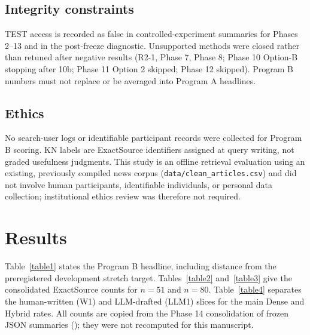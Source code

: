 \documentclass[10pt,letterpaper]{article}
\begin{document}
\subsection*{Integrity constraints}

TEST access is recorded as false in controlled-experiment summaries for Phases 2--13 and in the post-freeze diagnostic. Unsupported methods were closed rather than retuned after negative results (R2-1, Phase 7, Phase 8; Phase 10 Option-B stopping after 10b; Phase 11 Option 2 skipped; Phase 12 skipped). Program B numbers must not replace or be averaged into Program A headlines.

\subsection*{Ethics}

No search-user logs or identifiable participant records were collected for Program B scoring. KN labels are ExactSource identifiers assigned at query writing, not graded usefulness judgments. This study is an offline retrieval evaluation using an existing, previously compiled news corpus (\texttt{data/clean\_articles.csv}) and did not involve human participants, identifiable individuals, or personal data collection; institutional ethics review was therefore not required.

\section*{Results}
Table~\ref{table1} states the Program B headline, including distance from the preregistered development stretch target. Tables~\ref{table2} and~\ref{table3} give the consolidated ExactSource counts for $n = 51$ and $n = 80$. Table~\ref{table4} separates the human-written (W1) and LLM-drafted (LLM1) slices for the main Dense and Hybrid rates. All counts are copied from the Phase 14 consolidation of frozen JSON summaries (); they were not recomputed for this manuscript.
\end{document}
